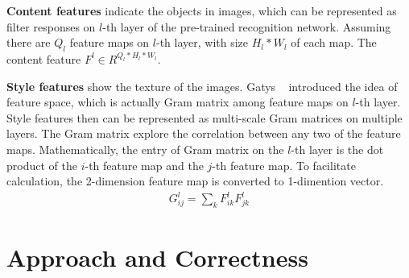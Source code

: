 \documentclass[10pt,twocolumn,letterpaper]{article}
\begin{document}
\textbf{Content features} indicate the objects in images, which can be represented as filter responses on $l$-th layer of the pre-trained recognition network. Assuming there are $Q_l$ feature maps on $l$-th layer, with size $H_l*W_l$ of each map. The content feature $F^l\in R^{Q_l*H_l*W_l}$. 

\textbf{Style features} show the texture of the images. Gatys \etal~\cite{Authors06} introduced the idea of feature space, which is actually Gram matrix among feature maps on $l$-th layer. Style features then can be represented as multi-scale Gram matrices on multiple layers. The Gram matrix explore the correlation between any two of the feature maps. Mathematically, the entry of Gram matrix on the $l$-th layer is the dot product of the $i$-th feature map and the $j$-th feature map. To facilitate calculation, the 2-dimension feature map is converted to 1-dimention vector.
\begin{align}
    G_{ij}^l= \sum_{k}{F_{ik}^l}{F_{jk}^l}
\end{align}


\section{Approach and Correctness}
\end{document}
